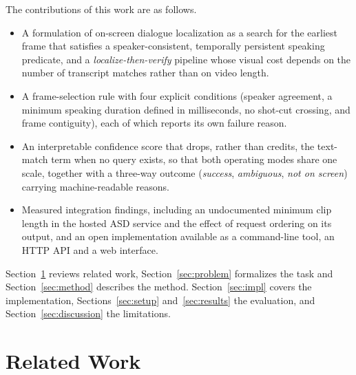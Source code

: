 \documentclass[conference]{IEEEtran}
\begin{document}
The contributions of this work are as follows.
\begin{itemize}
\item A formulation of on-screen dialogue localization as a search for the earliest frame that satisfies a speaker-consistent, temporally persistent speaking predicate, and a \emph{localize-then-verify} pipeline whose visual cost depends on the number of transcript matches rather than on video length.
\item A frame-selection rule with four explicit conditions (speaker agreement, a minimum speaking duration defined in milliseconds, no shot-cut crossing, and frame contiguity), each of which reports its own failure reason.
\item An interpretable confidence score that drops, rather than credits, the text-match term when no query exists, so that both operating modes share one scale, together with a three-way outcome (\textit{success}, \textit{ambiguous}, \textit{not on screen}) carrying machine-readable reasons.
\item Measured integration findings, including an undocumented minimum clip length in the hosted ASD service and the effect of request ordering on its output, and an open implementation available as a command-line tool, an HTTP API and a web interface.
\end{itemize}

Section~\ref{sec:related} reviews related work, Section~\ref{sec:problem} formalizes the task and Section~\ref{sec:method} describes the method. Section~\ref{sec:impl} covers the implementation, Sections~\ref{sec:setup} and~\ref{sec:results} the evaluation, and Section~\ref{sec:discussion} the limitations.

\section{Related Work}
\label{sec:related}
\end{document}
